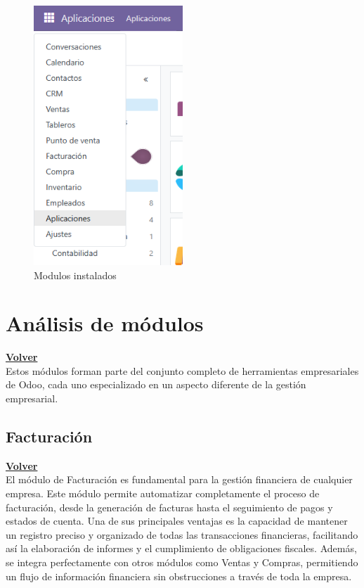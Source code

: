 \documentclass[a4paper,12pt]{article}
\begin{document}
\begin{figure}[h!]
    \centering
    \includegraphics[width=0.5\textwidth]{pr2odoo01-modulosInstalados.png}
    \caption{Modulos instalados}
\end{figure}
\FloatBarrier

\section{Análisis de módulos}
\hyperlink{anchor-indice}{\textbf{Volver}}\\

Estos módulos forman parte del conjunto completo de herramientas empresariales de Odoo, cada uno especializado en un aspecto diferente de la gestión empresarial.

\subsection{Facturación}
\hyperlink{anchor-indice}{\textbf{Volver}}\\

El módulo de Facturación es fundamental para la gestión financiera de cualquier empresa. Este módulo permite automatizar completamente el proceso de facturación, desde la generación de facturas hasta el seguimiento de pagos y estados de cuenta.
Una de sus principales ventajas es la capacidad de mantener un registro preciso y organizado de todas las transacciones financieras, facilitando así la elaboración de informes y el cumplimiento de obligaciones fiscales. Además, se integra perfectamente con otros módulos como Ventas y Compras, permitiendo un flujo de información financiera sin obstrucciones a través de toda la empresa.
\end{document}
